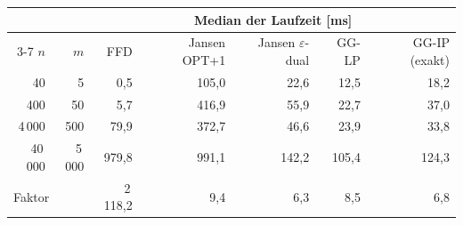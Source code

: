 \begin{tabular}{rrrrrrr}
\toprule
& & \multicolumn{5}{c}{Median der Laufzeit [ms]} \\
\cmidrule(lr){3-7}
$n$ & $m$ & FFD & Jansen OPT+1 & Jansen $\varepsilon$-dual & GG-LP & GG-IP (exakt) \\
\midrule
40 & 5 & 0{,}5 & 105{,}0 & 22{,}6 & 12{,}5 & 18{,}2 \\
400 & 50 & 5{,}7 & 416{,}9 & 55{,}9 & 22{,}7 & 37{,}0 \\
4\,000 & 500 & 79{,}9 & 372{,}7 & 46{,}6 & 23{,}9 & 33{,}8 \\
40\,000 & 5\,000 & 979{,}8 & 991{,}1 & 142{,}2 & 105{,}4 & 124{,}3 \\
\midrule
\multicolumn{2}{l}{Faktor} & 2\,118{,}2 & 9{,}4 & 6{,}3 & 8{,}5 & 6{,}8 \\
\bottomrule
\end{tabular}
